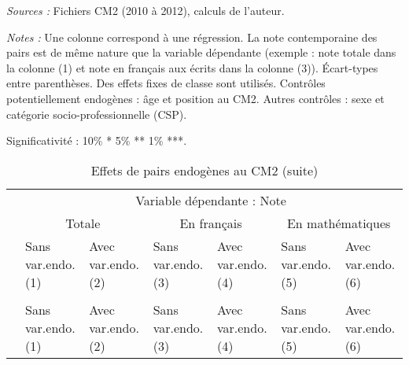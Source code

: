 \documentclass[
]{book}
\begin{document}
\begin{ThreePartTable}
\begin{TableNotes}
\item \textit{Sources :} Fichiers CM2 (2010 à 2012), calculs de l'auteur.
\item \textit{Notes :} Une colonne correspond à une régression. La note contemporaine des pairs est de même nature que la variable dépendante (exemple : note totale dans la colonne (1) et note en français aux écrits dans la colonne (3)). Écart-types entre parenthèses. Des effets fixes de classe sont utilisés. Contrôles potentiellement endogènes : âge et position au CM2. Autres contrôles : sexe et catégorie socio-professionnelle (CSP).
\item Significativité : 10\% * 5\% ** 1\% ***.
\end{TableNotes}
\begin{longtable}[t]{lllllll}
\caption{\label{tab:pepcmlmodelscm2}Effets de pairs endogènes au CM2}\\
\toprule
\multicolumn{1}{c}{} & \multicolumn{6}{c}{Variable dépendante : Note} \\
\cmidrule(l{3pt}r{3pt}){2-7}
\multicolumn{1}{c}{} & \multicolumn{2}{c}{Totale} & \multicolumn{2}{c}{En français} & \multicolumn{2}{c}{En mathématiques} \\
\cmidrule(l{3pt}r{3pt}){2-3} \cmidrule(l{3pt}r{3pt}){4-5} \cmidrule(l{3pt}r{3pt}){6-7}
 & \makecell{Sans var.endo. \\ (1) } & \makecell{Avec var.endo. \\ (2) } & \makecell{Sans var.endo. \\ (3) } & \makecell{Avec var.endo. \\ (4) } & \makecell{Sans var.endo. \\ (5) } & \makecell{Avec var.endo. \\ (6) }\\
\midrule
\endfirsthead
\caption[]{\label{tab:pepcmlmodelscm2}Effets de pairs endogènes au CM2 (suite)}\\
\toprule
 & \makecell{Sans var.endo. \\ (1) } & \makecell{Avec var.endo. \\ (2) } & \makecell{Sans var.endo. \\ (3) } & \makecell{Avec var.endo. \\ (4) } & \makecell{Sans var.endo. \\ (5) } & \makecell{Avec var.endo. \\ (6) }\\
\midrule
\endhead


\end{longtable}
\end{ThreePartTable}
\end{document}
